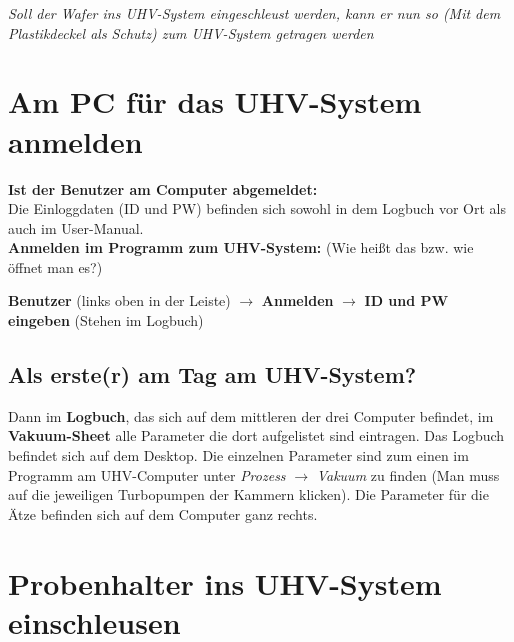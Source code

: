 \documentclass[
  ngerman,
  twoside,
  captions=tableheading,
  BCOR=.5cm,
  fontsize=11,
  ]{scrreprt}
\begin{document}
\begin{center}
\textit{Soll der Wafer ins UHV-System eingeschleust werden, kann er nun so (Mit dem Plastikdeckel als Schutz) zum UHV-System getragen werden}
\end{center}


\chapter{Am PC für das UHV-System anmelden}
\textbf{Ist der Benutzer am Computer abgemeldet:}\\
Die Einloggdaten (ID und PW) befinden sich sowohl in dem Logbuch vor Ort als auch im User-Manual.\\

\textbf{Anmelden im Programm zum UHV-System:} (Wie heißt das bzw. wie öffnet man es?)\\

\begin{center}
\textbf{Benutzer} (links oben in der Leiste) $\rightarrow$ \textbf{Anmelden} $\rightarrow$ \textbf{ID und PW eingeben} (Stehen im Logbuch)
\end{center}


\section{Als erste(r) am Tag am UHV-System?}
Dann im \textbf{Logbuch}, das sich auf dem mittleren der drei Computer befindet, im \textbf{Vakuum-Sheet} alle Parameter die dort aufgelistet sind eintragen. Das Logbuch befindet sich auf dem Desktop. Die einzelnen Parameter sind zum einen im Programm am UHV-Computer unter \textit{Prozess} $\rightarrow$ \textit{Vakuum} zu finden (Man muss auf die jeweiligen Turbopumpen der Kammern klicken). Die Parameter für die Ätze befinden sich auf dem Computer ganz rechts.

\chapter{Probenhalter ins UHV-System einschleusen}
\end{document}

